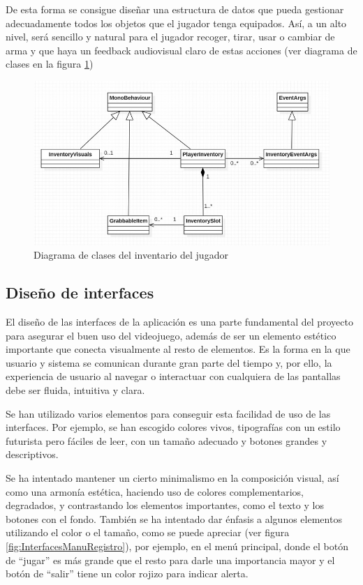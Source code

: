 De esta forma se consigue diseñar una estructura de datos que pueda gestionar adecuadamente todos los objetos que el jugador tenga equipados. Así, a un alto nivel, será sencillo y natural para el jugador recoger, tirar, usar o cambiar de arma y que haya un feedback audiovisual claro de estas acciones (ver diagrama de clases en la figura \ref{fig:InventarioUML})

\begin{figure}[h]
    \centering
    \includegraphics[scale=0.45]{img/InventoryClassDiagram.jpg}
    \caption{Diagrama de clases del inventario del jugador}
    \label{fig:InventarioUML}
    \end{figure}
    
\subsection{Diseño de interfaces}
El diseño de las interfaces de la aplicación es una parte fundamental del proyecto para asegurar el buen uso del videojuego, además de ser un elemento estético importante que conecta visualmente al resto de elementos. Es la forma en la que usuario y sistema se comunican durante gran parte del tiempo y, por ello, la experiencia de usuario al navegar o interactuar con cualquiera de las pantallas debe ser fluida, intuitiva y clara.

Se han utilizado varios elementos para conseguir esta facilidad de uso de las interfaces. Por ejemplo, se han escogido colores vivos, tipografías con un estilo futurista pero fáciles de leer, con un tamaño adecuado y botones grandes y descriptivos.

Se ha intentado mantener un cierto minimalismo en la composición visual, así como una armonía estética, haciendo uso de colores complementarios, degradados, y contrastando los elementos importantes, como el texto y los botones con el fondo. También se ha intentado dar énfasis a algunos elementos utilizando el color o el tamaño, como se puede apreciar (ver figura \ref{fig:InterfacesManuRegistro}), por ejemplo, en el menú principal, donde el botón de ``jugar'' es más grande que el resto para darle una importancia mayor y el botón de ``salir'' tiene un color rojizo para indicar alerta.

